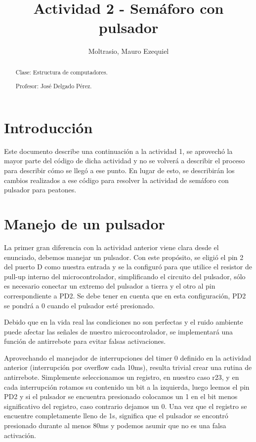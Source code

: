 \documentclass{article}
\begin{document}
\title{Actividad 2 - Semáforo con pulsador}
\author{Moltrasio, Mauro Ezequiel}
\date{}
\renewcommand{\abstractname}{\vspace{-\baselineskip}}

\begin{titlingpage}
    \maketitle
    \begin{abstract}

        Clase: Estructura de computadores.

        Profesor: José Delgado Pérez.
    \end{abstract}
\end{titlingpage}

\tableofcontents

\section{Introducción}

Este documento describe una continuación a la actividad 1, se aprovechó la
mayor parte del código de dicha actividad y no se volverá a describir el
proceso para describir cómo se llegó a ese punto. En lugar de esto, se
describirán los cambios realizados a ese código para resolver la actividad de
semáforo con pulsador para peatones.

\section{Manejo de un pulsador}

La primer gran diferencia con la actividad anterior viene clara desde el
enunciado, debemos manejar un pulsador. Con este propósito, se eligió el pin 2
del puerto D como nuestra entrada y se la configuró para que utilice el
resistor de pull-up interno del microcontrolador, simplificando el circuito
del pulsador, sólo es necesario conectar un extremo del pulsador a tierra y el
otro al pin correspondiente a PD2. Se debe tener en cuenta que en esta
configuración, PD2 se pondrá a 0 cuando el pulsador esté presionado.

Debido que en la vida real las condiciones no son perfectas y el ruido ambiente
puede afectar las señales de nuestro microcontrolador, se implementará una
función de antirrebote para evitar falsas activaciones.

Aprovechando el manejador de interrupciones del timer 0 definido en la
actividad anterior (interrupción por overflow cada 10ms), resulta trivial
crear una rutina de antirrebote. Simplemente seleccionamos un registro, en
nuestro caso r23, y en cada interrupción rotamos su contenido un bit a la
izquierda, luego leemos el pin PD2 y si el pulsador se encuentra presionado
colocamos un 1 en el bit menos significativo del registro, caso contrario
dejamos un 0. Una vez que el registro se encuentre completamente lleno de 1s,
significa que el pulsador se encontró presionado durante al menos 80ms y
podemos asumir que no es una falsa activación.
\end{document}
